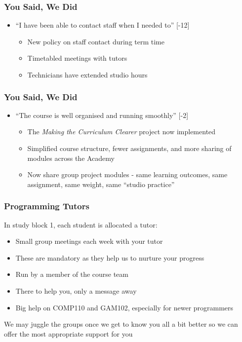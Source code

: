 \begin{frame}
	\frametitle{You Said, We Did}
			
	\begin{itemize}
		
		\item ``I have been able to contact staff when I needed to'' [-12]
		\begin{itemize}
			\item New policy on staff contact during term time 
			\item Timetabled meetings with tutors
			\item Technicians have extended studio hours
		\end{itemize}		
		
	\end{itemize}
\end{frame}

\begin{frame}
	\frametitle{You Said, We Did}
		
	\begin{itemize}
	
			\item ``The course is well organised and running smoothly'' [-2]
		\begin{itemize}
			\item The \textit{Making the Curriculum Clearer} project now implemented
			\item Simplified course structure, fewer assignments, and more sharing of modules across the Academy
			\item Now share group project modules - same learning outcomes, same assignment, same weight, same ``studio practice''
		\end{itemize}
		
	\end{itemize}
\end{frame}

\begin{frame}
	\frametitle{Programming Tutors}
	
	In study block 1, each student is allocated a tutor:
	
	\begin{itemize}
		\item Small group meetings each week with your tutor
		\item These are mandatory as they help us to nurture your progress
		\item Run by a member of the course team
		\item There to help you, only a message away
		\item Big help on COMP110 and GAM102, especially for newer programmers
	\end{itemize}
	
	\vspace{1em}
	
	We may juggle the groups once we get to know you all a bit better so we can offer the most appropriate support for you
	
\end{frame}

